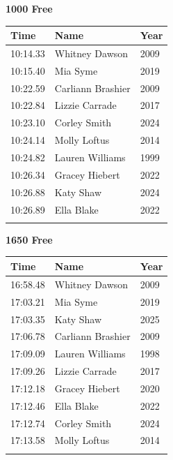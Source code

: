 \vspace{1.2em}
\noindent\begin{minipage}[t]{0.48\textwidth}
\centering
\textbf{\textcolor{teamprimary}{1000 Free}}\par
\vspace{0.5em}
\centering
\small
\renewcommand{\arraystretch}{1.0}
\setlength{\tabcolsep}{4pt}
\begin{tabular}{@{}p{1.8cm}p{3.0cm}p{1.0cm}@{}}
\toprule
\textbf{Time} & \textbf{Name} & \textbf{Year} \\
\midrule
10:14.33 & Whitney Dawson & 2009 \\
10:15.40 & Mia Syme & 2019 \\
10:22.59 & Carliann Brashier & 2009 \\
10:22.84 & Lizzie Carrade & 2017 \\
10:23.10 & Corley Smith & 2024 \\
10:24.14 & Molly Loftus & 2014 \\
10:24.82 & Lauren Williams & 1999 \\
10:26.34 & Gracey Hiebert & 2022 \\
10:26.88 & Katy Shaw & 2024 \\
10:26.89 & Ella Blake & 2022 \\
\bottomrule
\vspace{0.5em}
\end{tabular}
\end{minipage}
\hfill
\begin{minipage}[t]{0.48\textwidth}
\centering
\textbf{\textcolor{teamprimary}{1650 Free}}\par
\vspace{0.5em}
\centering
\small
\renewcommand{\arraystretch}{1.0}
\setlength{\tabcolsep}{4pt}
\begin{tabular}{@{}p{1.8cm}p{3.0cm}p{1.0cm}@{}}
\toprule
\textbf{Time} & \textbf{Name} & \textbf{Year} \\
\midrule
16:58.48 & Whitney Dawson & 2009 \\
17:03.21 & Mia Syme & 2019 \\
17:03.35 & Katy Shaw & 2025 \\
17:06.78 & Carliann Brashier & 2009 \\
17:09.09 & Lauren Williams & 1998 \\
17:09.26 & Lizzie Carrade & 2017 \\
17:12.18 & Gracey Hiebert & 2020 \\
17:12.46 & Ella Blake & 2022 \\
17:12.74 & Corley Smith & 2024 \\
17:13.58 & Molly Loftus & 2014 \\
\bottomrule
\vspace{0.5em}
\end{tabular}
\end{minipage}

